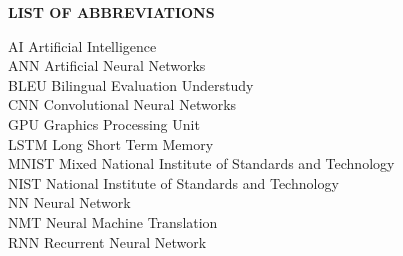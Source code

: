 \begin{center}
{\LARGE \bf LIST OF ABBREVIATIONS}\\
\end{center}
\vspace{1.6cm}
AI \dotfill Artificial Intelligence\\
ANN \dotfill Artificial Neural Networks\\
BLEU \dotfill Bilingual Evaluation Understudy\\
CNN \dotfill Convolutional Neural Networks\\
GPU \dotfill Graphics Processing Unit\\
LSTM \dotfill Long Short Term Memory\\
MNIST \dotfill Mixed National Institute of Standards and Technology\\
NIST \dotfill National Institute of Standards and Technology\\
NN \dotfill Neural Network\\
NMT \dotfill Neural Machine Translation\\
RNN \dotfill Recurrent Neural Network\\
